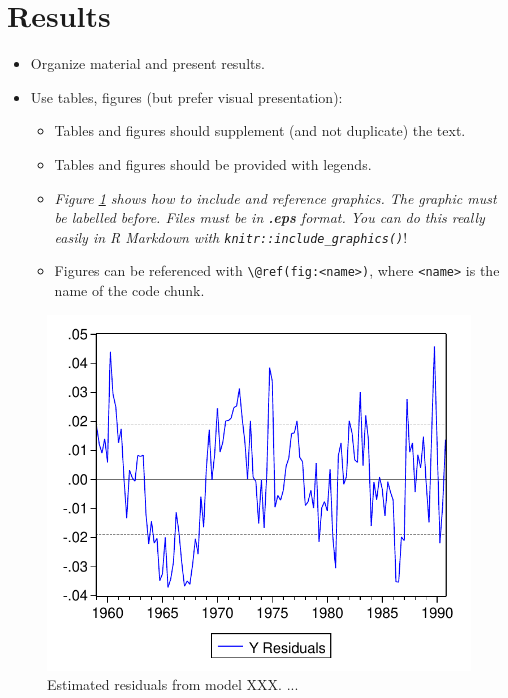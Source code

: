 \documentclass[a4paper,11pt]{article}
\begin{document}
\hypertarget{results}{%
\section{Results}\label{results}}
\begin{itemize}
\item
  Organize material and present results.
\item
  Use tables, figures (but prefer visual presentation):
  \begin{itemize}
  \item
    Tables and figures should supplement (and not duplicate) the text.
  \item
    Tables and figures should be provided with legends.
  \item
    \emph{Figure \ref{fig:graph} shows how to include and reference graphics.
    The graphic must be labelled before. Files must be in \textbf{.eps} format. You
    can do this really easily in R Markdown with \texttt{knitr::include\_graphics()}}!
  \item
    Figures can be referenced with \texttt{\textbackslash{}@ref(fig:\textless{}name\textgreater{})}, where \texttt{\textless{}name\textgreater{}} is the
    name of the code chunk.
  \end{itemize}
\end{itemize}
\begin{figure}

{\centering \includegraphics[width=0.5\linewidth]{figures/graph} 

}

\caption{Estimated residuals from model XXX. ...}\label{fig:graph}
\end{figure}
\end{document}
